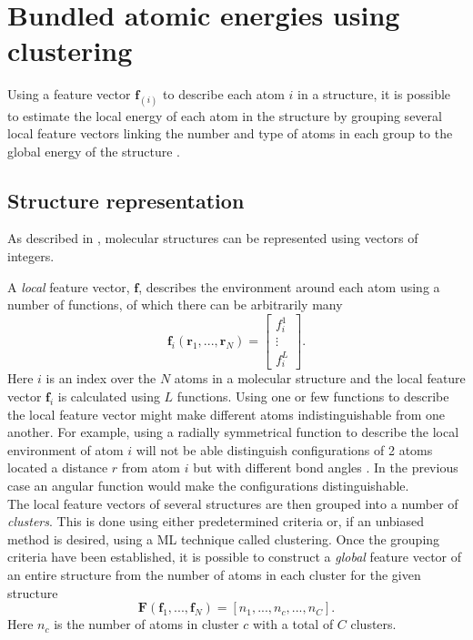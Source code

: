 \chapter{Bundled atomic energies using clustering}
Using a feature vector $\mathbf{f}_{(i)}$ to describe each atom $i$ in a structure, it is possible to estimate the local energy of each atom in the structure by grouping several local feature vectors linking the number and type of atoms in each group to the global energy of the structure \cite{Meldgaard}.

\section{Structure representation}

As described in \cite{Meldgaard}, molecular structures can be represented using vectors of integers.

A \textit{local} feature vector, $\mathbf{f}$, describes the environment around each atom using a number of functions, of which there can be arbitrarily many
\begin{equation}
	\mathbf{f}_i (\mathbf{r}_1, ... , \mathbf{r}_N) = 
	\begin{bmatrix}
	f_i^1 \\
	\vdots \\
	f_i^L
	\end{bmatrix}.
\end{equation}
Here $i$ is an index over the $N$ atoms in a molecular structure and the local feature vector $\mathbf{f}_i$ is calculated using $L$ functions. Using one or few functions to describe the local feature vector might make different atoms indistinguishable from one another. For example, using a radially symmetrical function to describe the local environment of atom $i$ will not be able distinguish configurations of 2 atoms located a distance $r$ from atom $i$ but with different bond angles \cite{Meldgaard}. In the previous case an angular function would make the configurations distinguishable. \\

The local feature vectors of several structures are then grouped into a number of \textit{clusters}. This is done using either predetermined criteria or, if an unbiased method is desired, using a ML technique called clustering. Once the grouping criteria have been established, it is possible to construct a \textit{global} feature vector of an entire structure from the number of atoms in each cluster for the given structure \cite{Meldgaard} 
\begin{equation}
	\mathbf{F}(\mathbf{f}_1, ..., \mathbf{f}_N) = [n_1, ..., n_c, ..., n_C].
	\label{eq:global_feature_vector}
\end{equation}
Here $n_c$ is the number of atoms in cluster $c$ with a total of $C$ clusters.

